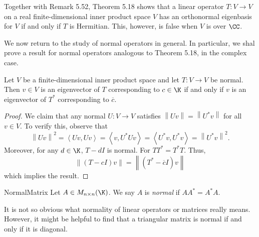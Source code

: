 \documentclass[linearalgebraII]{subfiles}
\begin{document}
    \begin{remark}
        Together with Remark 5.52, Theorem 5.18 shows that a linear operator $T:V\to V$ on a real finite-dimensional inner product space $V$ has an orthonormal eigenbasis for $V$ if and only if $T$ is Hermitian. This, however, is false when $V$ is over $\CC$.
    \end{remark}

    \begin{remark}
        We now return to the study of normal operators in general. In particular, we shal prove a result for normal operators analogous to Theorem 5.18, in the complex case.
    \end{remark}

    \begin{prop}{}
        Let $V$ be a finite-dimensional inner product space and let $T:V\to V$ be normal. Then $v\in V$ is an eigenvector of $T$ corresponding to $c\in\K$ if and only if $v$ is an eigenvector of $T^*$ corresponding to $\overline{c}$.
    \end{prop}

    \begin{proof}
        We claim that any normal $U:V\to V$ satisfies $\left\lVert Uv\right\rVert = \left\lVert U^*v\right\rVert$ for all $v\in V$. To verify this, observe that
        \begin{equation*}
            \left\lVert Uv\right\rVert ^2 = \left\langle Uv, Uv\right\rangle = \left\langle v, U^*Uv\right\rangle = \left\langle U^*v, U^*v\right\rangle = \left\lVert U^*v\right\rVert ^2.
        \end{equation*}
        Moreover, for any $d\in\K$, $T-dI$ is normal. For $TT^* = T^*T$. Thus,
        \begin{equation*}
            \left\lVert \left( T-cI \right) v\right\rVert = \left\lVert \left( T^*-\overline{c} I \right) v\right\rVert 
        \end{equation*}
        which implies the result.
    \end{proof}

    \begin{definition}{Normal}{Matrix}
        Let $A\in M_{n\times n}(\K)$. We say $A$ is \emph{normal} if $AA^* = A^*A$.
    \end{definition}

    \begin{remark}
        It is not so obvious what normality of linear operators or matrices really means. However, it might be helpful to find that a triangular matrix is normal if and only if it is diagonal.
    \end{remark}
\end{document}
